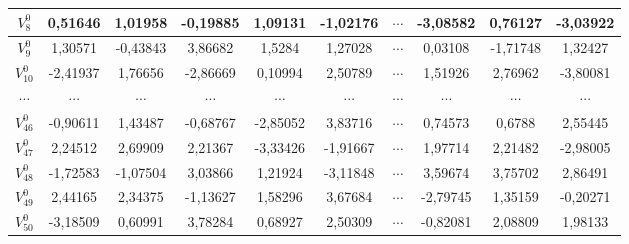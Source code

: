 {{\begin{enumerate}[align = left, left = 0cm, nolistsep]
\begin{enumerate}[label = (\alph*), align = left, left = 0cm, nolistsep]
{\begin{tabularx}{\textwidth}{|c|c|c|c|c|c|c|c|c|c|}
                            $V_{8}^{0}$  & 0,51646  & 1,01958  & -0,19885 & 1,09131  & -1,02176 & $\cdots$ & -3,08582 & 0,76127  & -3,03922 \\ \hline
                            $V_{9}^{0}$  & 1,30571  & -0,43843 & 3,86682  & 1,5284   & 1,27028  & $\cdots$ & 0,03108  & -1,71748 & 1,32427  \\ \hline
                            $V_{10}^{0}$ & -2,41937 & 1,76656  & -2,86669 & 0,10994  & 2,50789  & $\cdots$ & 1,51926  & 2,76962  & -3,80081 \\ \hline
                            $\cdots$     & $\cdots$ & $\cdots$ & $\cdots$ & $\cdots$ & $\cdots$ & $\cdots$ & $\cdots$ & $\cdots$ & $\cdots$ \\ \hline
                            $V_{46}^{0}$ & -0,90611 & 1,43487  & -0,68767 & -2,85052 & 3,83716  & $\cdots$ & 0,74573  & 0,6788   & 2,55445  \\ \hline
                            $V_{47}^{0}$ & 2,24512  & 2,69909  & 2,21367  & -3,33426 & -1,91667 & $\cdots$ & 1,97714  & 2,21482  & -2,98005 \\ \hline
                            $V_{48}^{0}$ & -1,72583 & -1,07504 & 3,03866  & 1,21924  & -3,11848 & $\cdots$ & 3,59674  & 3,75702  & 2,86491  \\ \hline
                            $V_{49}^{0}$ & 2,44165  & 2,34375  & -1,13627 & 1,58296  & 3,67684  & $\cdots$ & -2,79745 & 1,35159  & -0,20271 \\ \hline
                            $V_{50}^{0}$ & -3,18509 & 0,60991  & 3,78284  & 0,68927  & 2,50309  & $\cdots$ & -0,82081 & 2,08809  & 1,98133  \\ \hline
                        \end{tabularx}
                        }


\end{enumerate}
\end{enumerate}}}
